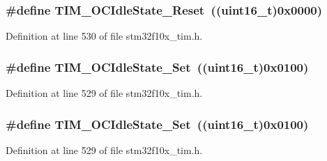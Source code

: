 \subsubsection[{\texorpdfstring{T\+I\+M\+\_\+\+O\+C\+Idle\+State\+\_\+\+Reset}{TIM_OCIdleState_Reset}}]{\setlength{\rightskip}{0pt plus 5cm}\#define T\+I\+M\+\_\+\+O\+C\+Idle\+State\+\_\+\+Reset~(({\bf uint16\+\_\+t})0x0000)}\hypertarget{group___t_i_m___output___compare___idle___state_gace5465bc9e90ba7862b3af9e6cc9b97e}{}\label{group___t_i_m___output___compare___idle___state_gace5465bc9e90ba7862b3af9e6cc9b97e}


Definition at line 530 of file stm32f10x\+\_\+tim.\+h.

\subsubsection[{\texorpdfstring{T\+I\+M\+\_\+\+O\+C\+Idle\+State\+\_\+\+Set}{TIM_OCIdleState_Set}}]{\setlength{\rightskip}{0pt plus 5cm}\#define T\+I\+M\+\_\+\+O\+C\+Idle\+State\+\_\+\+Set~(({\bf uint16\+\_\+t})0x0100)}\hypertarget{group___t_i_m___output___compare___idle___state_ga86d8f895a1ec584323f6c02c7edfad4c}{}\label{group___t_i_m___output___compare___idle___state_ga86d8f895a1ec584323f6c02c7edfad4c}


Definition at line 529 of file stm32f10x\+\_\+tim.\+h.

\subsubsection[{\texorpdfstring{T\+I\+M\+\_\+\+O\+C\+Idle\+State\+\_\+\+Set}{TIM_OCIdleState_Set}}]{\setlength{\rightskip}{0pt plus 5cm}\#define T\+I\+M\+\_\+\+O\+C\+Idle\+State\+\_\+\+Set~(({\bf uint16\+\_\+t})0x0100)}\hypertarget{group___t_i_m___output___compare___idle___state_ga86d8f895a1ec584323f6c02c7edfad4c}{}\label{group___t_i_m___output___compare___idle___state_ga86d8f895a1ec584323f6c02c7edfad4c}


Definition at line 529 of file stm32f10x\+\_\+tim.\+h.

